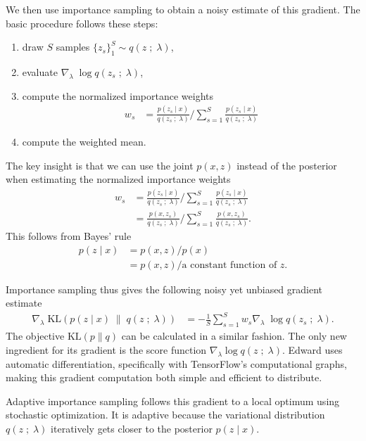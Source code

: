 We then use importance sampling to obtain a noisy estimate of this gradient.
The basic procedure follows these steps:
\begin{enumerate}
  \item draw $S$ samples $\{z_s\}_1^S \sim q(z\;;\;\lambda)$,
  \item evaluate $\nabla_\lambda\; \log q(z_s\;;\;\lambda)$,
  \item compute the normalized importance weights
  \begin{align*}
    w_s
    &=
    \frac{p(z_s \mid x)}{q(z_s\;;\;\lambda)}
    \Bigg/
    \sum_{s=1}^{S}
    \frac{p(z_s \mid x)}{q(z_s\;;\;\lambda)}
  \end{align*}
  \item compute the weighted mean.
\end{enumerate}
The key insight is that we can use the joint $p(x,z)$ instead of the posterior
when estimating the normalized importance weights
\begin{align*}
  w_s
  &=
  \frac{p(z_s \mid x)}{q(z_s\;;\;\lambda)}
  \Bigg/
  \sum_{s=1}^{S}
  \frac{p(z_s \mid x)}{q(z_s\;;\;\lambda)} \\
  &=
  \frac{p(x, z_s)}{q(z_s\;;\;\lambda)}
  \Bigg/
  \sum_{s=1}^{S}
  \frac{p(x, z_s)}{q(z_s\;;\;\lambda)}.
\end{align*}
This follows from Bayes' rule
\begin{align*}
  p(z \mid x)
  &=
  p(x, z) / p(x)\\
  &=
  p(x, z) / \text{a constant function of }z.
\end{align*}

Importance sampling thus gives the following noisy yet unbiased gradient
estimate
\begin{align*}
\nabla_\lambda\;
  \text{KL}(
  p(z \mid x)
  \;\|\;
  q(z\;;\;\lambda)
  )
  &=
  -
  \frac{1}{S}
  \sum_{s=1}^S
  w_s
  \nabla_\lambda\; \log q(z_s\;;\;\lambda).
\end{align*}
The objective $\text{KL}(p\|q)$ can be calculated in a similar fashion.
The only new ingredient for its gradient is the score function
$\nabla_\lambda \log q(z\;;\;\lambda)$.  Edward uses automatic
differentiation, specifically with TensorFlow's computational graphs,
making this gradient computation both simple and efficient to
distribute.

Adaptive importance sampling follows this gradient to a local optimum using
stochastic optimization. It is adaptive because the variational distribution
$q(z\;;\;\lambda)$ iteratively gets closer to the posterior $p(z \mid x)$.


